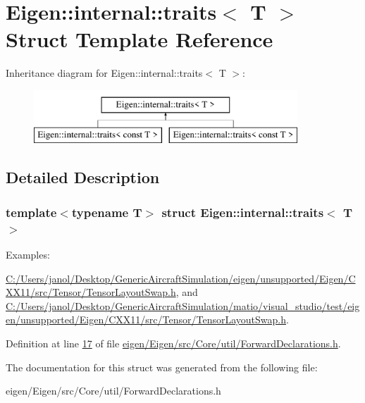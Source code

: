 \hypertarget{struct_eigen_1_1internal_1_1traits}{}\section{Eigen\+:\+:internal\+:\+:traits$<$ T $>$ Struct Template Reference}
\label{struct_eigen_1_1internal_1_1traits}
Inheritance diagram for Eigen\+:\+:internal\+:\+:traits$<$ T $>$\+:\begin{figure}[H]
\begin{center}
\leavevmode
\includegraphics[height=2.000000cm]{struct_eigen_1_1internal_1_1traits}
\end{center}
\end{figure}


\subsection{Detailed Description}
\subsubsection*{template$<$typename T$>$\newline
struct Eigen\+::internal\+::traits$<$ T $>$}

\begin{Desc}
\item[Examples\+: ]\par
\hyperlink{_c_1_2_users_2janol_2_desktop_2_generic_aircraft_simulation_2eigen_2unsupported_2_eigen_2_c_x_x1995ff76eaccdd7a9ea13b307626fb9df}{C\+:/\+Users/janol/\+Desktop/\+Generic\+Aircraft\+Simulation/eigen/unsupported/\+Eigen/\+C\+X\+X11/src/\+Tensor/\+Tensor\+Layout\+Swap.\+h}, and \hyperlink{_c_1_2_users_2janol_2_desktop_2_generic_aircraft_simulation_2matio_2visual_studio_2test_2eigen_2286551beec45c5254494adb391cdc80f}{C\+:/\+Users/janol/\+Desktop/\+Generic\+Aircraft\+Simulation/matio/visual\+\_\+studio/test/eigen/unsupported/\+Eigen/\+C\+X\+X11/src/\+Tensor/\+Tensor\+Layout\+Swap.\+h}.\end{Desc}


Definition at line \hyperlink{eigen_2_eigen_2src_2_core_2util_2_forward_declarations_8h_source_l00017}{17} of file \hyperlink{eigen_2_eigen_2src_2_core_2util_2_forward_declarations_8h_source}{eigen/\+Eigen/src/\+Core/util/\+Forward\+Declarations.\+h}.



The documentation for this struct was generated from the following file\+:\begin{DoxyCompactItemize}
\item 
eigen/\+Eigen/src/\+Core/util/\+Forward\+Declarations.\+h\end{DoxyCompactItemize}
